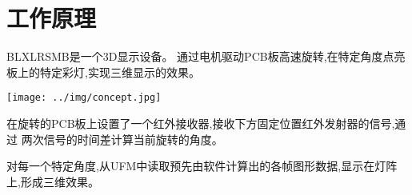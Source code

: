 \section{工作原理}
BLXLRSMB是一个3D显示设备。
通过电机驱动PCB板高速旋转,在特定角度点亮板上的特定彩灯,实现三维显示的效果。
\begin{center}
  \texttt{[image: ../img/concept.jpg]}
\end{center}

在旋转的PCB板上设置了一个红外接收器,接收下方固定位置红外发射器的信号,通过
两次信号的时间差计算当前旋转的角度。

对每一个特定角度,从UFM中读取预先由软件计算出的各帧图形数据,显示在灯阵上,形成三维效果。

